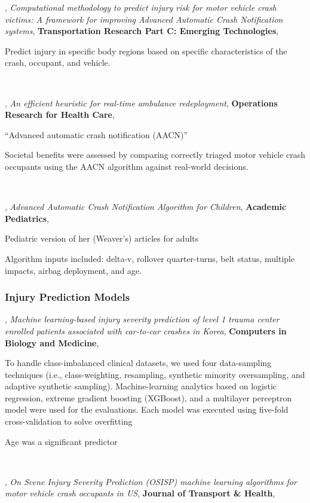 \cite{BOSE20111048},
{\it Computational methodology to predict injury risk for motor vehicle crash victims: A framework for improving Advanced Automatic Crash Notification systems},
{\bf Transportation Research Part C: Emerging Technologies},

Predict injury in specific body regions based on specific characteristics of the crash, occupant, and vehicle.

\

\cite{JAGTENBERG201527},
{\it An efficient heuristic for real-time ambulance redeployment},
{\bf Operations Research for Health Care},

``Advanced automatic crash notification (AACN)''

Societal benefits were assessed by comparing
correctly triaged motor vehicle crash occupants using the
AACN algorithm against real-world decisions.

\

\cite{WEAVER20221057},
{\it Advanced Automatic Crash Notification Algorithm for Children},
{\bf Academic Pediatrics},

Pediatric version of her (Weaver's) articles for adults

Algorithm inputs included: delta-v, rollover quarter-turns, belt status, multiple impacts, airbag deployment, and age.

\subsubsection{Injury Prediction Models}

\cite{KONG2023106393},
{\it Machine learning-based injury severity prediction of level 1 trauma center enrolled patients associated with car-to-car crashes in Korea},
{\bf Computers in Biology and Medicine},

To handle class-imbalanced clinical datasets, we used four data-sampling
techniques (i.e., class-weighting, resampling, synthetic minority oversampling, and adaptive synthetic
sampling). Machine-learning analytics based on logistic regression, extreme gradient boosting (XGBoost), and a
multilayer perceptron model were used for the evaluations. Each model was executed using five-fold cross-validation
to solve overfitting

Age was a significant predictor

\

\cite{CANDEFJORD2021101124},
{\it On Scene Injury Severity Prediction (OSISP) machine learning algorithms for motor vehicle crash occupants in US},
{\bf Journal of Transport \& Health},

